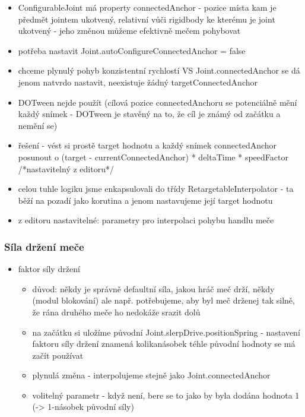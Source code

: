 \begin{itemize}
  \item ConfigurableJoint má property connectedAnchor - pozice místa kam je předmět jointem ukotvený, relativní vůči rigidbody ke kterému je joint ukotvený - jeho změnou můžeme efektivně mečem pohybovat
  \item potřeba nastavit Joint.autoConfigureConnectedAnchor = false
  \item chceme plynulý pohyb konzistentní rychlostí VS Joint.connectedAnchor se dá jenom natvrdo nastavit, neexistuje žádný targetConnectedAnchor 
  \item DOTween nejde použít (cílová pozice connectedAnchoru se potenciálně mění každý snímek - DOTween je stavěný na to, že cíl je známý od začátku a nemění se)
  \item řešení - vést si prostě target hodnotu a každý snímek connectedAnchor posunout o (target - currentConnectedAnchor) * deltaTime * speedFactor /*nastavitelný z editoru*/
  \item celou tuhle logiku jsme enkapsulovali do třídy RetargetableInterpolator - ta běží na pozadí jako korutina a jenom nastavujeme její target hodnotu
  \item z editoru nastavitelné: parametry pro interpolaci pohybu handlu meče
\end{itemize}

\subsubsection*{Síla držení meče}

\begin{itemize}
  \item faktor síly držení
    \begin{itemize}
      \item důvod: někdy je správně defaultní síla, jakou hráč meč drží, někdy (modul blokování) ale např. potřebujeme, aby byl meč drženej tak silně, že rána druhého meče ho nedokáže srazit dolů
      \item na začátku si uložíme původní Joint.slerpDrive.positionSpring - nastavení faktoru síly držení znamená kolikanásobek téhle původní hodnoty se má začít používat
      \item plynulá změna - interpolujeme stejně jako Joint.connectedAnchor
      \item volitelný parametr - když není, bere se to jako by byla dodána hodnota 1 (-> 1-násobek původní síly)
    \end{itemize}
\end{itemize}

